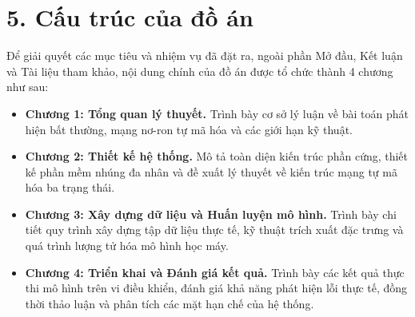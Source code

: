 \section*{5. Cấu trúc của đồ án}
Để giải quyết các mục tiêu và nhiệm vụ đã đặt ra, ngoài phần Mở đầu, Kết luận và Tài liệu tham khảo, nội dung chính của đồ án được tổ chức thành 4 chương như sau:
\begin{itemize}
    \item \textbf{Chương 1: Tổng quan lý thuyết.} Trình bày cơ sở lý luận về bài toán phát hiện bất thường, mạng nơ-ron tự mã hóa và các giới hạn kỹ thuật.
    \item \textbf{Chương 2: Thiết kế hệ thống.} Mô tả toàn diện kiến trúc phần cứng, thiết kế phần mềm nhúng đa nhân và đề xuất lý thuyết về kiến trúc mạng tự mã hóa ba trạng thái.
    \item \textbf{Chương 3: Xây dựng dữ liệu và Huấn luyện mô hình.} Trình bày chi tiết quy trình xây dựng tập dữ liệu thực tế, kỹ thuật trích xuất đặc trưng và quá trình lượng tử hóa mô hình học máy.
    \item \textbf{Chương 4: Triển khai và Đánh giá kết quả.} Trình bày các kết quả thực thi mô hình trên vi điều khiển, đánh giá khả năng phát hiện lỗi thực tế, đồng thời thảo luận và phân tích các mặt hạn chế của hệ thống.
\end{itemize}



